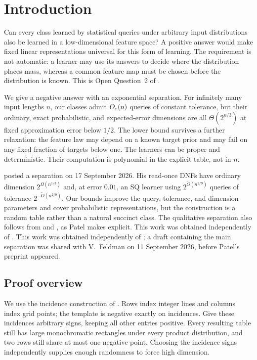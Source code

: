 \section{Introduction}\label{sec:intro}
Can every class learned by statistical queries under arbitrary input distributions also be learned in a low-dimensional feature space? A positive answer would make fixed linear representations universal for this form of learning. The requirement is not automatic: a learner may use its answers to decide where the distribution places mass, whereas a common feature map must be chosen before the distribution is known. This is Open Question~2 of \citet{FKS26}.

We give a negative answer with an exponential separation. For infinitely many input lengths $n$, our classes admit $O_\varepsilon(n)$ queries of constant tolerance, but their ordinary, exact probabilistic, and expected-error dimensions are all $\Theta(2^{n/3})$ at fixed approximation error below $1/2$. The lower bound survives a further relaxation: the feature law may depend on a known target prior and may fail on any fixed fraction of targets below one. The learners can be proper and deterministic. Their computation is polynomial in the explicit table, not in $n$.

\citet{Patel26} posted a separation on 17 September 2026. His read-once DNFs have ordinary dimension $2^{\Omega(n^{1/3})}$ and, at error $0.01$, an SQ learner using $2^{\widetilde O(n^{2/9})}$ queries of tolerance $2^{-\widetilde O(n^{2/9})}$. Our bounds improve the query, tolerance, and dimension parameters and cover probabilistic representations, but the construction is a random table rather than a natural succinct class. The qualitative separation also follows from \citet{DKR25} and \citet{RS10}, as Patel makes explicit.
\ifreview
This work was obtained independently of \citet{Patel26}.
\else
This work was obtained independently of \citet{Patel26}; a draft containing the main separation was shared with V.\ Feldman on 11 September 2026, before Patel's preprint appeared.
\fi

\subsection{Proof overview}\label{sec:techniques}
We use the incidence construction of \citet{HHPTZ22}. Rows index integer lines and columns index grid points; the template is negative exactly on incidences. Give these incidences arbitrary signs, keeping all other entries positive. Every resulting table still has large monochromatic rectangles under every product distribution, and two rows still share at most one negative point. Choosing the incidence signs independently supplies enough randomness to force high dimension.

